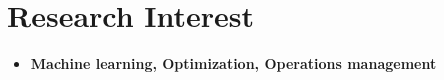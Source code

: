 \documentclass[letterpaper,10.8pt]{article}
\begin{document}
\head{}

\section{Research Interest}
\begin{itemize}
      \item \textbf{Machine learning, Optimization, Operations management}
\end{itemize}



\end{document}
